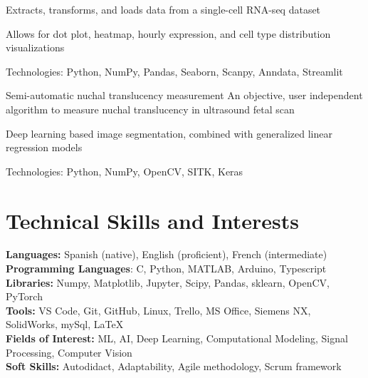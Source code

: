 \documentclass{resume}
\begin{document}
    \resumeItemListStart
    \item {Extracts, transforms, and loads data from a single-cell RNA-seq dataset}
    \item {Allows for dot plot, heatmap, hourly expression, and cell type distribution visualizations}
    \item {Technologies: Python, NumPy, Pandas, Seaborn, Scanpy, Anndata, Streamlit}
    \resumeItemListEnd

    \resumeProject
    {Semi-automatic nuchal translucency measurement} %
    {An objective, user independent algorithm to measure nuchal translucency in ultrasound fetal scan}
    {} %

    \resumeItemListStart
    \item {Deep learning based image segmentation, combined with generalized linear regression models}
    \item {Technologies: Python, NumPy, OpenCV, SITK, Keras}
    \resumeItemListEnd

    \resumeSubHeadingListEnd


    \vspace{-5mm}


    \section{\textbf{Technical Skills and Interests}} \label{sec:skills}
    \begin{itemize}[leftmargin=0.05in, label={}]
        \small{\item{
            \textbf{Languages:}{ Spanish (native), English (proficient), French (intermediate) } \\
            \textbf{Programming Languages}{: C, Python, MATLAB, Arduino, Typescript } \\
            \textbf{Libraries:}{ Numpy, Matplotlib, Jupyter, Scipy, Pandas, sklearn, OpenCV, PyTorch}\\
            \textbf{Tools:}{ VS Code, Git, GitHub, Linux, Trello, MS Office, Siemens NX, SolidWorks, mySql,
                \LaTeX} \\
            \textbf{Fields of Interest:}
            {ML, AI, Deep Learning, Computational Modeling, Signal Processing, Computer Vision} \\
            \textbf{Soft Skills:}{ Autodidact, Adaptability, Agile methodology, Scrum framework} \\
        }}
    \end{itemize}
\end{document}
